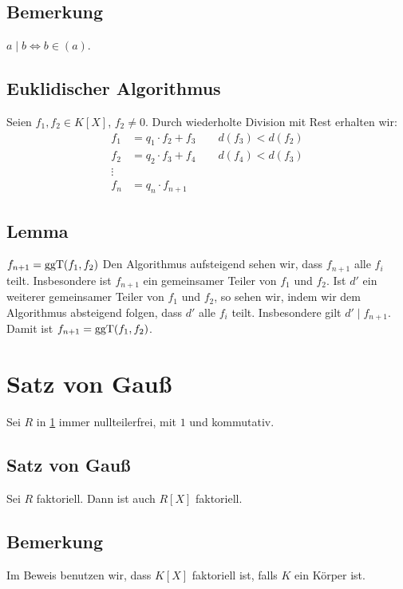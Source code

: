 \subsection[Bemerkung, die den Namen eigentlich nicht verdient hat]{Bemerkung} %
\label{sub:716}
$a \mid b \iff b \in (a)$.

\subsection{Euklidischer Algorithmus} %
\label{sub:717}
Seien $f_1, f_2 \in K[X]$, $f_2 \not= 0$. Durch wiederholte Division mit Rest erhalten wir: 
\begin{align*}
	f_1 &= q_1 \cdot f_2 + f_3 \qquad d(f_3) < d(f_2) \\
	f_2 &= q_2 \cdot f_3 + f_4 \qquad d(f_4) < d(f_3) \\
	\vdots & \\
	f_n &= q_n \cdot f_{n+1}
\end{align*}

\subsection[Lemma: Der euklidische Algorithmus berechnet den $\ggT$]{Lemma} %
\label{sub:718}
$f_{n+1}= \operatorname{ggT}(f_1,f_2)$
Den Algorithmus aufsteigend sehen wir, dass $f_{n+1}$ alle $f_i$ teilt. Insbesondere ist $f_{n+1}$ ein gemeinsamer Teiler von $f_1$ und $f_2$. Ist $d'$ ein weiterer gemeinsamer
Teiler von $f_1$ und $f_2$, so sehen wir, indem wir dem Algorithmus absteigend folgen, dass $d'$ alle $f_i$ teilt. Insbesondere gilt $d' \mid f_{n+1}$. Damit ist $f_{n+1} = \operatorname{ggT}(f_1, f_2)$. \bewende
\newpage


\section{Satz von Gauß} %
\label{sec:8}
Sei $R$ in \ref{sec:8} immer nullteilerfrei, mit $1$ und kommutativ.

\subsection{Satz von Gauß} %
\label{sub:81}
Sei $R$ faktoriell. Dann ist auch $R[X]$ faktoriell.

\subsection[Bemerkung: Hinweis zu Beweistrategie]{Bemerkung} %
\label{sub:82}
Im Beweis benutzen wir, dass $K[X]$ faktoriell ist, falls $K$ ein Körper ist.

